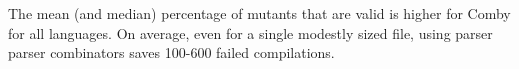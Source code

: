\documentclass[acmsmall]{acmart}
\newcommand{\mr}[2]{\multirow{#1}{*}{#2}}
\begin{document}
{%

The mean (and median) percentage of mutants that are valid is higher for
Comby for all languages.  On average, even for a single modestly sized
file, using parser parser combinators saves 100-600 failed
compilations.

}
\end{document}
